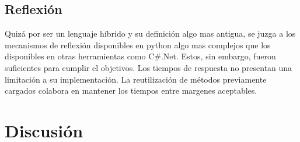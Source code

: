 \documentclass[twoside,twocolumn]{article}
\begin{document}
\subsection{Reflexión}
Quizá por ser un lenguaje híbrido y su definición algo mas antigua, se 
juzga a los mecanismos de reflexión disponibles en python algo mas 
complejos que los disponibles en otras herramientas como C\#.Net. Estos, sin 
embargo, fueron suficientes para cumplir el objetivos. Los tiempos de respuesta 
no presentan una limitación a su implementación. La reutilización de métodos 
previamente cargados colabora en mantener los tiempos entre margenes aceptables.






% 



\section{Discusión}	
\end{document}

